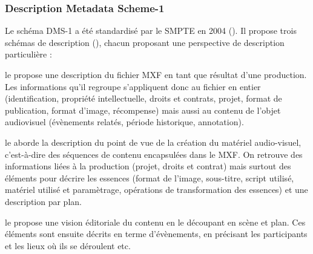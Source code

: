 \subsubsection{Description Metadata Scheme-1}
Le schéma DMS-1 a été standardisé par le SMPTE en 2004 (\cite{Smpte2004}).
Il propose trois schémas de description (), chacun proposant une perspective de description particulière : 
\begin{liste}
	\item le  propose une description du fichier MXF en tant que résultat d'une production. 
	Les informations qu'il regroupe s'appliquent donc au fichier en entier (identification, propriété intellectuelle, droits et contrats, projet, format de publication, format d'image, récompense) mais aussi au contenu de l'objet audiovisuel (évènements relatés, période historique, annotation).

	\item le  aborde la description du point de vue de la création du matériel audio-visuel, c'est-à-dire des séquences de contenu encapsulées dans le MXF. 
	On retrouve des informations liées à la production (projet, droits et contrat) mais surtout des éléments pour décrire les essences (format de l'image, sous-titre, script utilisé, matériel utilisé et paramètrage, opérations de transformation des essences) et une description par plan.

	\item le  propose une vision éditoriale du contenu en le découpant en scène et plan. 
	Ces éléments sont ensuite décrits en terme d'évènements, en précisant les participants et les lieux où ils se déroulent etc.
\end{liste}

